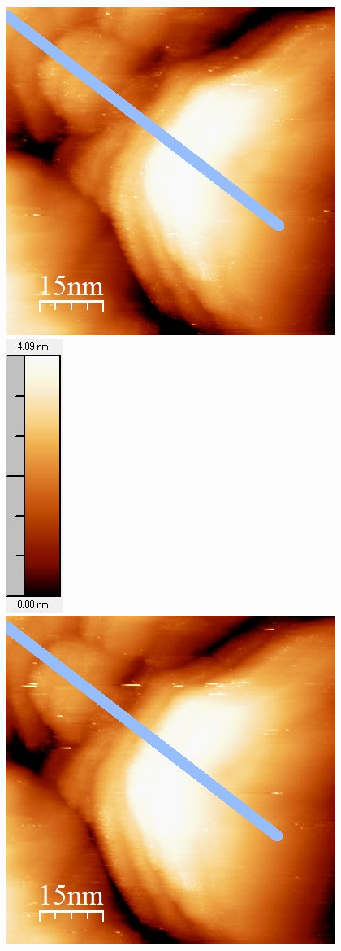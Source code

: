 \documentclass[12pt,a4paper]{article}
\begin{document}
\begin{figure}[H]
\centering
\includegraphics[scale=0.6]{Bilder/Anhang/IGain/3000_IGain_vor.jpg}
\includegraphics[scale=0.6]{Bilder/Anhang/IGain/3000_IGain_vor_Skala.jpg}
\includegraphics[scale=0.6]{Bilder/Anhang/IGain/3000_IGain_nach.jpg}

\end{figure}
\end{document}
